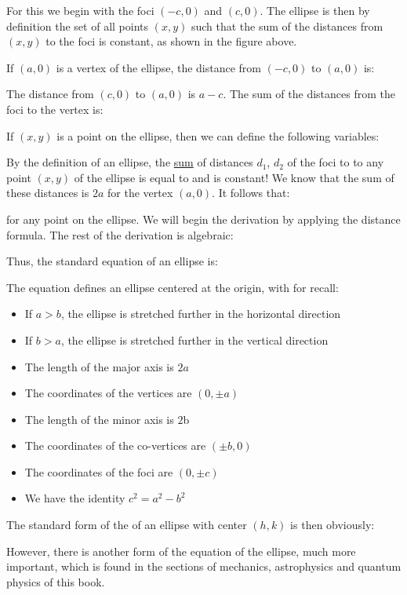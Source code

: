 \begin{enumerate}
		For this we begin with the foci $\left(-c,0\right)$ and $\left(c,0\right)$. The ellipse is then by definition the set of all points $\left(x,y\right)$ such that the sum of the distances from $\left(x,y\right)$ to the foci is constant, as shown in the figure above.
		
		If $\left(a,0\right)$ is a vertex of the ellipse, the distance from $\left(-c,0\right)$ to $\left(a,0\right)$ is:
		
		The distance from $\left(c,0\right)$ to $\left(a,0\right)$ is $a-c$. The sum of the distances from the foci to the vertex is:
		
		If $\left(x,y\right)$ is a point on the ellipse, then we can define the following variables:
		
		By the definition of an ellipse, the \underline{sum} of  distances ${d}_{1}$, ${d}_{2}$ of the foci to to any point $(x,y)$ of the ellipse is equal to  and is constant! We know that the sum of these distances is $2a$ for the vertex $(a,0)$. It follows that:
		
		for any point on the ellipse. We will begin the derivation by applying the distance formula. The rest of the derivation is algebraic:
		
		Thus, the standard equation of an ellipse is:
		
		The equation defines an ellipse centered at the origin, with for recall:
		\begin{itemize}
			\item If $a>b$, the ellipse is stretched further in the horizontal direction
			\item If $b>a$, the ellipse is stretched further in the vertical direction
			\item The length of the major axis is $2a$
			\item The coordinates of the vertices are $(0,\pm a)$
			\item The length of the minor axis is $2$b
			\item The coordinates of the co-vertices are $(\pm b,0)$
			\item The coordinates of the foci are $(0,\pm c)$
			\item We have the identity $c^2=a^2-b^2$
		\end{itemize}
		\label{centered offset ellipse}The standard form of the of an ellipse with center $(h,k)$ is then obviously:
		
	
		However, there is another form of the equation of the ellipse, much more important, which is found in the sections of mechanics, astrophysics and quantum physics of this book.
		

\end{enumerate}
